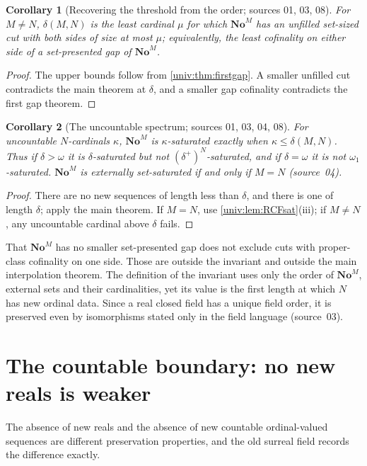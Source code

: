 \documentclass[11pt,letterpaper]{article}
\numberwithin{equation}{section}
\newtheorem{corollary}[corollary]{Corollary}
\theoremstyle{definition}
\theoremstyle{remark}
\newcommand{\No}{\mathbf{No}}
\newcommand{\NoM}{\No^{M}}
\begin{document}
\begin{corollary}[Recovering the threshold from the order; sources 01, 03, 08]\label{univ:cor:recover}
For $M\ne N$, $\delta(M,N)$ is the least cardinal $\mu$ for which $\NoM$ has an
unfilled set-sized cut with both sides of size at most $\mu$; equivalently, the
least cofinality on either side of a set-presented gap of $\NoM$.
\end{corollary}
\begin{proof}
The upper bounds follow from \cref{univ:thm:firstgap}. A smaller unfilled cut
contradicts the main theorem at $\delta$, and a smaller gap cofinality
contradicts the first gap theorem.
\end{proof}

\begin{corollary}[The uncountable spectrum; sources 01, 03, 04, 08]\label{univ:cor:spectrum}
For uncountable $N$-cardinals $\kappa$, $\NoM$ is $\kappa$-saturated exactly
when $\kappa\leq\delta(M,N)$. Thus if $\delta>\omega$ it is
$\delta$-saturated but not $(\delta^+)^N$-saturated, and if $\delta=\omega$ it
is not $\omega_1$-saturated. $\NoM$ is externally set-saturated if and only if
$M=N$ (source~04).
\end{corollary}
\begin{proof}
There are no new sequences of length less than $\delta$, and there is one of
length $\delta$; apply the main theorem. If $M=N$, use
\cref{univ:lem:RCFsat}(iii); if $M\ne N$, any uncountable cardinal above
$\delta$ fails.
\end{proof}

That $\NoM$ has no smaller set-presented gap does not exclude cuts with
proper-class cofinality on one side. Those are outside the invariant and
outside the main interpolation theorem. The definition of the invariant uses
only the order of $\NoM$, external sets and their cardinalities, yet its value
is the first length at which $N$ has new ordinal data. Since a real closed
field has a unique field order, it is preserved even by isomorphisms stated
only in the field language (source~03).

\section{The countable boundary: no new reals is weaker}\label{univ:sec:omega}

The absence of new reals and the absence of new countable ordinal-valued
sequences are different preservation properties, and the old surreal field
records the difference exactly.
\end{document}
